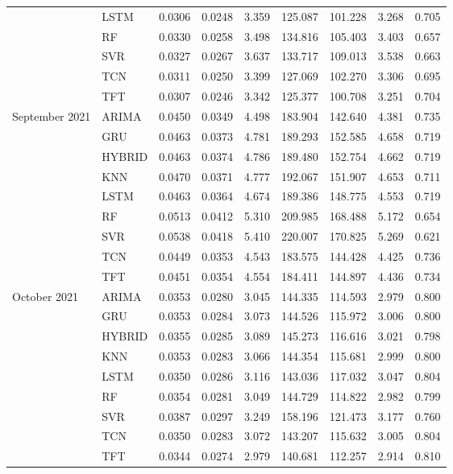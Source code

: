 \begin{tabular}{lllllllll}
 & LSTM & 0.0306 & 0.0248 & 3.359 & 125.087 & 101.228 & 3.268 & 0.705 \\
 & RF & 0.0330 & 0.0258 & 3.498 & 134.816 & 105.403 & 3.403 & 0.657 \\
 & SVR & 0.0327 & 0.0267 & 3.637 & 133.717 & 109.013 & 3.538 & 0.663 \\
 & TCN & 0.0311 & 0.0250 & 3.399 & 127.069 & 102.270 & 3.306 & 0.695 \\
 & TFT & 0.0307 & 0.0246 & 3.342 & 125.377 & 100.708 & 3.251 & 0.704 \\
September 2021 & ARIMA & 0.0450 & 0.0349 & 4.498 & 183.904 & 142.640 & 4.381 & 0.735 \\
 & GRU & 0.0463 & 0.0373 & 4.781 & 189.293 & 152.585 & 4.658 & 0.719 \\
 & HYBRID & 0.0463 & 0.0374 & 4.786 & 189.480 & 152.754 & 4.662 & 0.719 \\
 & KNN & 0.0470 & 0.0371 & 4.777 & 192.067 & 151.907 & 4.653 & 0.711 \\
 & LSTM & 0.0463 & 0.0364 & 4.674 & 189.386 & 148.775 & 4.553 & 0.719 \\
 & RF & 0.0513 & 0.0412 & 5.310 & 209.985 & 168.488 & 5.172 & 0.654 \\
 & SVR & 0.0538 & 0.0418 & 5.410 & 220.007 & 170.825 & 5.269 & 0.621 \\
 & TCN & 0.0449 & 0.0353 & 4.543 & 183.575 & 144.428 & 4.425 & 0.736 \\
 & TFT & 0.0451 & 0.0354 & 4.554 & 184.411 & 144.897 & 4.436 & 0.734 \\
October 2021 & ARIMA & 0.0353 & 0.0280 & 3.045 & 144.335 & 114.593 & 2.979 & 0.800 \\
 & GRU & 0.0353 & 0.0284 & 3.073 & 144.526 & 115.972 & 3.006 & 0.800 \\
 & HYBRID & 0.0355 & 0.0285 & 3.089 & 145.273 & 116.616 & 3.021 & 0.798 \\
 & KNN & 0.0353 & 0.0283 & 3.066 & 144.354 & 115.681 & 2.999 & 0.800 \\
 & LSTM & 0.0350 & 0.0286 & 3.116 & 143.036 & 117.032 & 3.047 & 0.804 \\
 & RF & 0.0354 & 0.0281 & 3.049 & 144.729 & 114.822 & 2.982 & 0.799 \\
 & SVR & 0.0387 & 0.0297 & 3.249 & 158.196 & 121.473 & 3.177 & 0.760 \\
 & TCN & 0.0350 & 0.0283 & 3.072 & 143.207 & 115.632 & 3.005 & 0.804 \\
 & TFT & 0.0344 & 0.0274 & 2.979 & 140.681 & 112.257 & 2.914 & 0.810 \\

\end{tabular}
